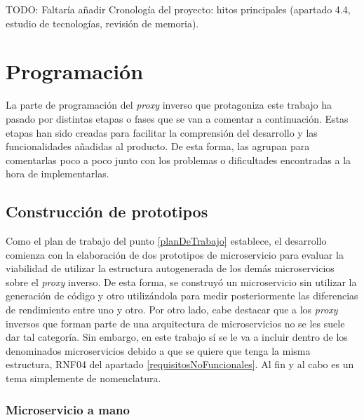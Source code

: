 \documentclass[11pt,spanish,listoffigures]{tfgetsinf}
\begin{document}
TODO: Faltaría añadir Cronología del proyecto: hitos principales (apartado 4.4, estudio de tecnologías, revisión de memoria).


	\section{Programación} \label{programacion}

La parte de programación del \emph{proxy} inverso que protagoniza este trabajo ha pasado por distintas etapas o fases que se van a comentar a continuación. Estas etapas han sido creadas para facilitar la comprensión del desarrollo y las funcionalidades añadidas al producto. De esta forma, las agrupan para comentarlas poco a poco junto con los problemas o dificultades encontradas a la hora de implementarlas.


		\subsection{Construcción de prototipos}

Como el plan de trabajo del punto \ref{planDeTrabajo} establece, el desarrollo comienza con la elaboración de dos prototipos de microservicio para evaluar la viabilidad de utilizar la estructura autogenerada de los demás microservicios sobre el \emph{proxy} inverso. De esta forma, se construyó un microservicio sin utilizar la generación de código y otro utilizándola para medir posteriormente las diferencias de rendimiento entre uno y otro. Por otro lado, cabe destacar que a los \emph{proxy} inversos que forman parte de una arquitectura de microservicios no se les suele dar tal categoría. Sin embargo, en este trabajo sí se le va a incluir dentro de los denominados microservicios debido a que se quiere que tenga la misma estructura, RNF04 del apartado \ref{requisitosNoFuncionales}. Al fin y al cabo es un tema simplemente de nomenclatura.


			\subsubsection{Microservicio a mano}
\end{document}
